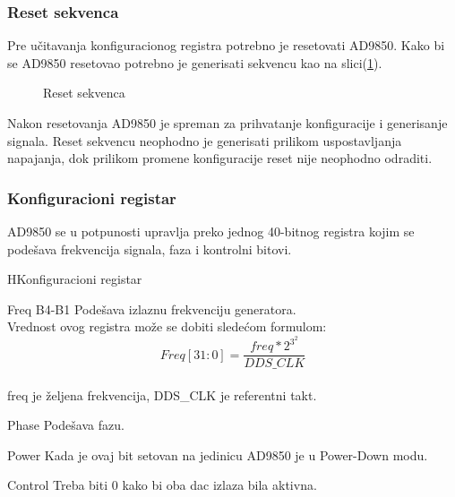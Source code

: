 \subsubsection{Reset sekvenca}
Pre učitavanja konfiguracionog registra potrebno je resetovati AD9850.
Kako bi se AD9850 resetovao potrebno je generisati sekvencu kao na slici(\ref{ad9850_rst_seq}). \\

\begin{figure}[H]
  \centering{
    \scalebox{1.2}{
      
    }}
  \caption{Reset sekvenca}
  \label{ad9850_rst_seq}
\end{figure}

Nakon resetovanja AD9850 je spreman za prihvatanje konfiguracije i generisanje signala.
Reset sekvencu neophodno je generisati prilikom uspostavljanja napajanja, dok prilikom promene
konfiguracije reset nije neophodno odraditi.

\subsubsection{Konfiguracioni registar}

AD9850 se u potpunosti upravlja preko jednog 40-bitnog registra kojim se
podešava frekvencija signala, faza i kontrolni bitovi.

\begin{register}{H}{Konfiguracioni registar}{}%
  \label{example}%
   \\
  \begin{regdesc}\begin{reglist}
    \item [Freq B4-B1] Podešava izlaznu frekvenciju generatora.\\
      Vrednost ovog registra može se dobiti sledećom formulom:
      \[
      Freq [31:0] = \frac{freq*2^3^2}{DDS\_CLK}
      \] \\
      freq je željena frekvencija, DDS\_CLK je referentni takt.
    \item [Phase] Podešava fazu.
    \item [Power] Kada je ovaj bit setovan na jedinicu AD9850 je u Power-Down modu.
    \item [Control] Treba biti 0 kako bi oba \gls{dac} izlaza bila aktivna.
    \end{reglist}\end{regdesc}
\end{register}


